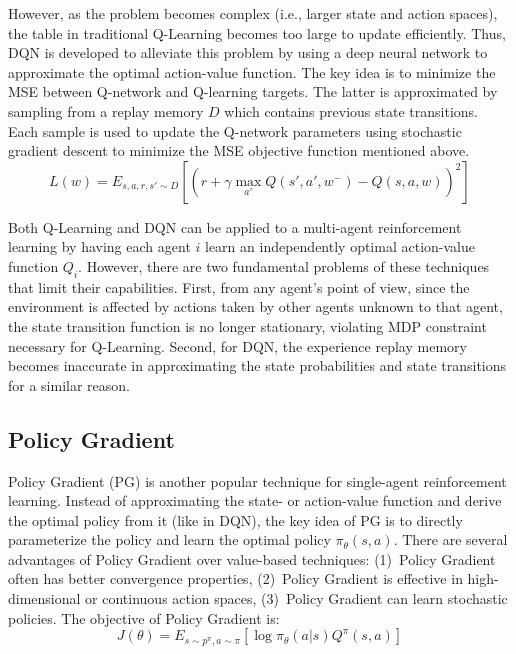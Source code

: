 
However, as the problem becomes complex (i.e., larger state and action
spaces), the table in traditional Q-Learning becomes too large to update
efficiently. Thus, DQN is developed to alleviate this problem by using a deep
neural network to approximate the optimal action-value function. The key idea
is to minimize the MSE between Q-network and Q-learning targets. The latter is
approximated by sampling from a replay memory $D$ which contains previous
state transitions. Each sample is used to update the Q-network parameters
using stochastic gradient descent to minimize the MSE objective function
mentioned above.
\begin{equation}
L(w) = E_{s,a,r,s'\sim D} [(r + \gamma \max_{a'} Q(s',a',w^-) - Q(s,a,w))^2]
\end{equation}

Both Q-Learning and DQN can be applied to a multi-agent reinforcement learning
by having each agent $i$ learn an independently optimal action-value function
$Q_i$. However, there are two fundamental problems of these techniques that
limit their capabilities. First, from any agent's point of view, since the
environment is affected by actions taken by other agents unknown to that
agent, the state transition function is no longer stationary, violating MDP
constraint necessary for Q-Learning. Second, for DQN, the experience replay
memory becomes inaccurate in approximating the state probabilities and state
transitions for a similar reason.


\subsection{Policy Gradient}

Policy Gradient (PG) is another popular technique for single-agent
reinforcement learning. Instead of approximating the state- or action-value
function and derive the optimal policy from it (like in DQN), the key idea of
PG is to directly parameterize the policy and learn the optimal policy
$\pi_\theta (s,a)$. There are several advantages of Policy Gradient over
value-based techniques: (1)~Policy Gradient often has better convergence
properties, (2)~Policy Gradient is effective in high-dimensional or continuous
action spaces, (3)~Policy Gradient can learn stochastic policies. The
objective of Policy Gradient is:
\begin{equation}
J(\theta) = E_{s\sim p^\pi, a\sim \pi} [\log \pi_\theta (a|s) Q^\pi(s,a)]
\end{equation}


